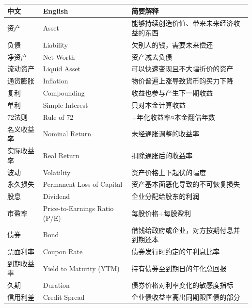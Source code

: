 \documentclass[a4paper,11pt,oneside,fontset=none,UTF8,zihao=-4]{ctexbook}
\begin{document}
\begin{longtable}[]{@{}
  >{\raggedright\arraybackslash}p{}
  >{\raggedright\arraybackslash}p{}
  >{\raggedright\arraybackslash}p{}@{}}
\toprule\noalign{}\rowcolor{dh-pink!25}
\begin{minipage}[b]{\linewidth}\raggedright
中文
\end{minipage} & \begin{minipage}[b]{\linewidth}\raggedright
English
\end{minipage} & \begin{minipage}[b]{\linewidth}\raggedright
简要解释
\end{minipage} \\
\midrule\noalign{}
\endhead
\bottomrule\noalign{}
\endlastfoot
资产 & Asset & 能够持续创造价值、带来未来经济收益的东西 \\
负债 & Liability & 欠别人的钱，需要未来偿还 \\
净资产 & Net Worth & 资产减去负债 \\
流动资产 & Liquid Asset & 可以快速变现且不大幅折价的资产 \\
通货膨胀 & Inflation & 物价普遍上涨导致货币购买力下降 \\
复利 & Compounding & 收益也参与产生下一期收益 \\
单利 & Simple Interest & 只对本金计算收益 \\
72法则 & Rule of 72 & 72÷年化收益率≈本金翻倍年数 \\
名义收益率 & Nominal Return & 未经通胀调整的收益率 \\
实际收益率 & Real Return & 扣除通胀后的收益率 \\
波动 & Volatility & 资产价格上下起伏的幅度 \\
永久损失 & Permanent Loss of Capital &
资产基本面恶化导致的不可恢复损失 \\
股息 & Dividend & 企业分配给股东的利润 \\
市盈率 & Price-to-Earnings Ratio (P/E) & 每股价格÷每股盈利 \\
债券 & Bond & 借钱给政府或企业，对方按期付息并到期还本 \\
票面利率 & Coupon Rate & 债券发行时约定的年利息比率 \\
到期收益率 & Yield to Maturity (YTM) & 持有债券至到期日的年化总回报 \\
久期 & Duration & 债券价格对利率变化的敏感度指标 \\
信用利差 & Credit Spread & 企业债收益率高出同期限国债的部分 \\

\end{longtable}
\end{document}
